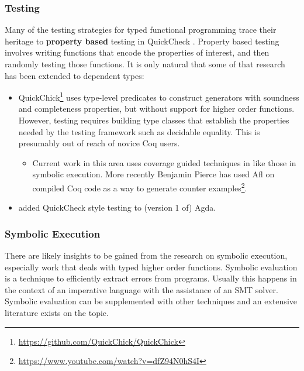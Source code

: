 \subsubsection{Testing}
 
Many of the testing strategies for typed functional programming trace their heritage to \textbf{property based} testing in QuickCheck \cite{quickcheck}.
Property based testing involves writing functions that encode the properties of interest, and then randomly testing those functions.
It is only natural that some of that research has been extended to dependent types:
\begin{itemize}
\item
QuickChick\footnote{\url{https://github.com/QuickChick/QuickChick}} \cite{denes2014quickchick,lampropoulos2017generating,lampropoulos2017beginner,lampropoulos2018random}
 uses type-level predicates to construct generators with soundness and completeness properties, but without support for higher order functions.
However, testing requires building type classes that establish the properties needed by the testing framework such as decidable equality.
This is presumably out of reach of novice Coq users.
\begin{itemize}
\item
Current work in this area uses coverage guided techniques in \cite{lampropoulos2019coverage} like those in symbolic execution.
More recently Benjamin Pierce has used Afl on compiled Coq code as a way to generate counter examples\footnote{\url{https://www.youtube.com/watch?v=dfZ94N0hS4I}}.
\end{itemize}
\item \cite{dybjer2003combining} added QuickCheck style testing to (version 1 of) Agda.
\end{itemize}
 
\subsubsection{Symbolic Execution}
 
There are likely insights to be gained from the research on symbolic execution, especially work that deals with typed higher order functions.
Symbolic evaluation is a technique to efficiently extract errors from programs.
Usually this happens in the context of an imperative language with the assistance of an SMT solver.
Symbolic evaluation can be supplemented with other techniques and an extensive literature exists on the topic.
 
